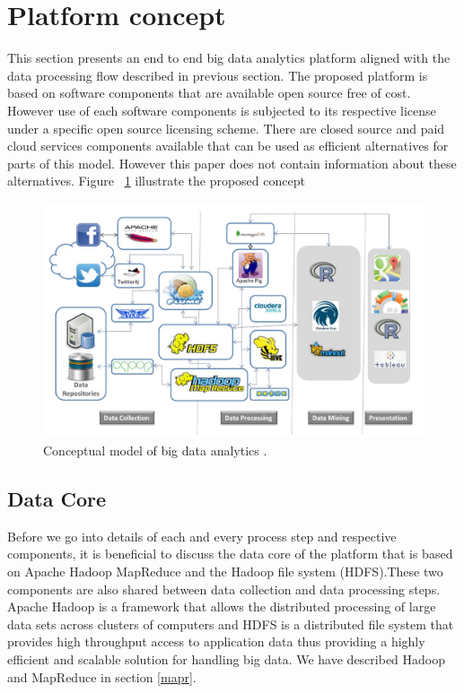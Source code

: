  \section{Platform concept}
 This section presents an end to end big data analytics platform aligned with the data processing flow described in previous section. The proposed platform is based on software components that are available open source free of cost. However use of each software components is subjected to its respective license under a specific open source licensing scheme. There are closed source and paid cloud services components available that can be used as efficient alternatives for parts of this model. However this paper does not contain information about these alternatives. Figure ~\ref{fig:cplatform} illustrate the proposed concept
 \begin{figure}[!h]
    \begin{center}
      \includegraphics[width=\textwidth]{images/cplatform.pdf}
      \caption{Conceptual model of big data analytics .}
      \label{fig:cplatform}
    \end{center}
  \end{figure} 
\subsection{Data Core}
Before we go into details of each and every process step and respective components, it is beneficial to discuss the data core of the platform that is based on Apache Hadoop MapReduce and the Hadoop file system (HDFS).These two components are also shared between data collection and data processing steps.  Apache Hadoop is a framework that allows the distributed processing of large data sets across clusters of computers and HDFS is a distributed file system that provides high throughput access to application data\cite{apachehadoop} thus providing a highly efficient and scalable solution for handling big data. We have described Hadoop and MapReduce in section \ref{mapr}.

